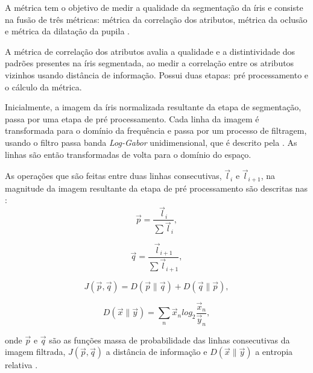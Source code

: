 \par A métrica tem o objetivo de medir a qualidade da segmentação da íris e consiste na fusão de três métricas: métrica da correlação dos atributos, métrica da oclusão e métrica da dilatação da pupila \cite{du2010}.

\par A métrica de correlação dos atributos avalia a qualidade e a distintividade dos padrões presentes na íris segmentada, ao medir a correlação entre os atributos vizinhos usando distância de informação. Possui duas etapas: pré processamento e o cálculo da métrica.

\par Inicialmente, a imagem da íris normalizada resultante da etapa de segmentação, passa por uma etapa de pré processamento. Cada linha da imagem é transformada para o domínio da frequência e passa por um processo de filtragem, usando o filtro passa banda \textit{Log-Gabor} unidimensional, que é descrito pela . As linhas são então transformadas de volta para o domínio do espaço.


\par As operações que são feitas entre duas linhas consecutivas, $\vec{l}_{i}$ e $\vec{l}_{i+1}$, na magnitude da imagem resultante da etapa de pré processamento são descritas nas :
\begin{equation} \label{eq:fce:fcm1}
    \vec{p} = \frac{\vec{l}_{i}}{\sum\vec{l}_{i}},
\end{equation}

\begin{equation} \label{eq:fce:fcm2}
    \vec{q} = \frac{\vec{l}_{i+1}}{\sum\vec{l}_{i+1}},
\end{equation}

\begin{equation} \label{eq:fce:fcm3}
    J(\vec{p},\vec{q}) = D(\vec{p}\parallel\vec{q}) + D(\vec{q}\parallel\vec{p}),
\end{equation}

\begin{equation} \label{eq:fce:fcm4}
    D(\vec{x}\parallel\vec{y}) = \sum_{n}\vec{x}_{n}log_{2}\frac{\vec{x}_{n}}{\vec{y}_{n}},
\end{equation}

\noindent onde $\vec{p}$ e $\vec{q}$ são as funções massa de probabilidade das linhas consecutivas da imagem filtrada, $J(\vec{p},\vec{q})$ a distância de informação e $D(\vec{x}\parallel\vec{y})$ a entropia relativa \cite{Mackay2002-RelativeEntropy}.

